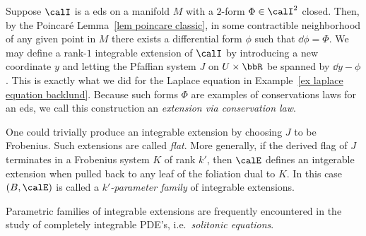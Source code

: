 \begin{rem}\label{rem 7.5.4 Ivey}
    Suppose $\calI$ is a \gls{eds} on a manifold $M$ with a $2$-form $\Phi\in\calI^2$ closed. Then, by the Poincar\'e Lemma~\ref{lem poincare classic}, in some contractible neighborhood of any given point in $M$ there exists a differential form $\phi$ such that $\dd\phi=\Phi$. We may define a rank-$1$ integrable extension of $\calI$ by introducing a new coordinate $y$ and letting the Pfaffian system $J$ on $U\times\bbR$ be spanned by $\dd y-\phi$. This is exactly what we did for the Laplace equation in Example~\ref{ex laplace equation backlund}. Because such forms $\Phi$ are examples of conservations laws for an \gls{eds}, we call this construction an \emph{extension via conservation law}.
\end{rem}


\begin{rem}
    One could trivially produce an integrable extension by choosing $J$ to be Frobenius. Such extensions are called \emph{flat}. More generally, if the derived flag of $J$ terminates in a Frobenius system $K$ of rank $k'$, then $\calE$ defines an intgerable extension when pulled back to any leaf of the foliation dual to $K$. In this case $(B,\calE)$ is called a \emph{$k'$-parameter family} of integrable extensions.
\end{rem}

Parametric families of integrable extensions are frequently encountered in the study of completely integrable PDE's, i.e.\ \emph{solitonic equations}. 

